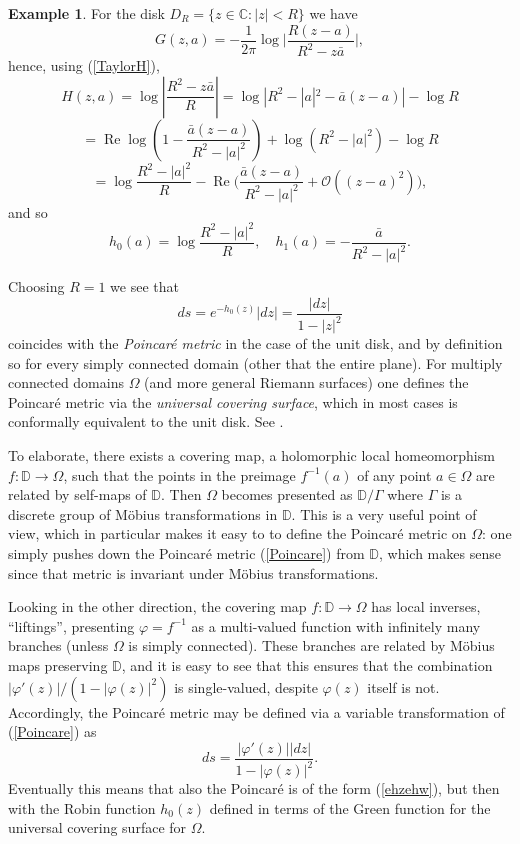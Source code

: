 \documentclass[reqno,12pt]{article}
\theoremstyle{plain}
\theoremstyle{definition}
\newtheorem{example}[defn]{Example}
\numberwithin{equation}{section}
\numberwithin{figure}{section}
\DeclareMathOperator{\re}{Re}
\def\D{{\mathbb D}}
\def\C{{\mathbb C}}
\begin{document}
\begin{example}\label{ex:disk}
For the disk $D_R=\{z\in\C: |z|< R\}$ we have
$$
G(z,a)=-\frac{1}{2\pi}\log \Big|\frac{R(z-a)}{R^2-z\bar{a}}\Big|,
$$
hence, using (\ref{TaylorH}),
$$
H(z,a)=\log |\frac{R^2-z\bar{a}}{R}|
=\log|R^2-|a|^2-\bar{a}(z-a)|-\log R
$$
$$
=\re\log (1-\frac{\bar{a}(z-a)}{R^2-|a|^2})+\log(R^2-|a|^2)-\log R
$$
$$
=\log \frac{R^2-|a|^2}{R}-\re \Big(\frac{\bar{a}(z-a)}{R^2-|a|^2}+\mathcal{O}((z-a)^2)\Big),
$$
and so
\begin{equation}\label{h0h1disk}
h_0(a)=\log \frac{R^2-|a|^2}{R}, \quad h_1(a)=-\frac{\bar{a}}{R^2-|a|^2}.
\end{equation}

Choosing $R=1$ we see that
\begin{equation}\label{Poincare}
ds=e^{-h_0(z)}|dz|= \frac{|dz|}{1-|z|^2}
\end{equation}
coincides with the {\it Poincar\'{e} metric} in the case of the unit disk, and by definition so for every 
simply connected domain (other that the entire plane). For multiply connected domains $\Omega$ 
(and more general Riemann surfaces) one defines the Poincar\'{e} metric via the {\it universal covering surface}, 
which in most cases is conformally equivalent to the unit disk. See \cite{Ahlfors-1973, Beardon-Minda-2007}.

To elaborate, there exists a covering map, a holomorphic local homeomorphism $f:\D\to\Omega$,
such that the points in the preimage $f^{-1}(a)$ of any point $a\in\Omega$ are related by 
self-maps of $\D$. Then $\Omega$ becomes presented as $\D/\Gamma$ where
$\Gamma$ is a discrete group of M\"obius transformations in $\D$. 
This is a very useful point of view, which in particular makes it 
easy to to define the Poincar\'{e} metric on $\Omega$: one simply pushes down the Poincar\'{e} metric (\ref{Poincare}) from 
$\D$, which makes sense since that metric is invariant under M\"obius transformations.

Looking in the other direction, the covering map $f:\D\to\Omega$ 
has local inverses, ``liftings'', presenting $\varphi=f^{-1}$ as a multi-valued function with infinitely many branches
(unless $\Omega$ is simply connected).  These branches are related by M\"obius maps preserving $\D$, and
it is easy to see that this ensures that the combination $|\varphi'(z)|/(1-|\varphi(z)|^{2})$ is single-valued, despite $\varphi(z)$ itself is not.
Accordingly, the Poincar\'{e} metric may be defined via a variable transformation of (\ref{Poincare}) as
$$
ds=\frac{|\varphi'(z)||dz|}{1-|\varphi(z)|^2}.
$$
Eventually this means that also the Poincar\'{e} is of the form (\ref{ehzehw}), but then with the Robin function $h_0(z)$ defined in terms of
the Green function for the universal covering surface for $\Omega$.  


\end{example}
\end{document}
